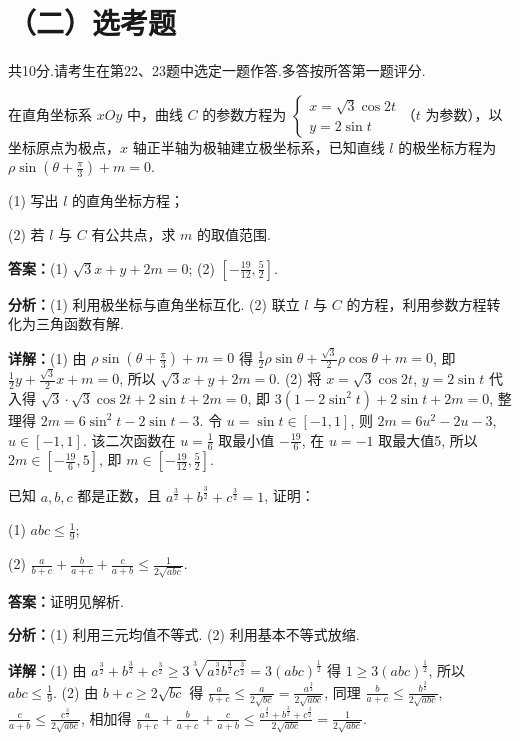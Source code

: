 \section*{（二）选考题}
共10分.请考生在第22、23题中选定一题作答.多答按所答第一题评分.

\begin{question}[points=10]
[选修4-4：坐标系与参数方程]

在直角坐标系 $xOy$ 中，曲线 $C$ 的参数方程为 $\begin{cases} x = \sqrt{3}\cos 2t \\ y = 2\sin t \end{cases}$（$t$ 为参数），以坐标原点为极点，$x$ 轴正半轴为极轴建立极坐标系，已知直线 $l$ 的极坐标方程为 $\rho\sin(\theta+\frac{\pi}{3})+m=0$.

(1) 写出 $l$ 的直角坐标方程；

(2) 若 $l$ 与 $C$ 有公共点，求 $m$ 的取值范围.
\begin{solution}
\textbf{答案：}(1) $\sqrt{3}x+y+2m=0$; (2) $[-\frac{19}{12}, \frac{5}{2}]$.

\textbf{分析：}(1) 利用极坐标与直角坐标互化.
(2) 联立 $l$ 与 $C$ 的方程，利用参数方程转化为三角函数有解.

\textbf{详解：}(1) 由 $\rho\sin(\theta+\frac{\pi}{3})+m=0$ 得 $\frac12\rho\sin\theta+\frac{\sqrt3}{2}\rho\cos\theta+m=0$, 即 $\frac12 y+\frac{\sqrt3}{2}x+m=0$, 所以 $\sqrt3 x+y+2m=0$.
(2) 将 $x=\sqrt3\cos2t$, $y=2\sin t$ 代入得 $\sqrt3\cdot\sqrt3\cos2t + 2\sin t + 2m=0$, 即 $3(1-2\sin^2t)+2\sin t+2m=0$, 整理得 $2m=6\sin^2t -2\sin t -3$. 令 $u=\sin t\in[-1,1]$, 则 $2m=6u^2-2u-3$, $u\in[-1,1]$. 该二次函数在 $u=\frac16$ 取最小值 $-\frac{19}{6}$, 在 $u=-1$ 取最大值5, 所以 $2m\in[-\frac{19}{6},5]$, 即 $m\in[-\frac{19}{12},\frac52]$.
\end{solution}
\end{question}

\begin{question}[points=10]
[选修4-5：不等式选讲]

已知 $a,b,c$ 都是正数，且 $a^{\frac32}+b^{\frac32}+c^{\frac32}=1$, 证明：

(1) $abc \le \frac19$;

(2) $\frac{a}{b+c}+\frac{b}{a+c}+\frac{c}{a+b} \le \frac{1}{2\sqrt{abc}}$.
\begin{solution}
\textbf{答案：}证明见解析.

\textbf{分析：}(1) 利用三元均值不等式.
(2) 利用基本不等式放缩.

\textbf{详解：}(1) 由 $a^{\frac32}+b^{\frac32}+c^{\frac32} \ge 3\sqrt[3]{a^{\frac32}b^{\frac32}c^{\frac32}} = 3(abc)^{\frac12}$ 得 $1 \ge 3(abc)^{\frac12}$, 所以 $abc \le \frac19$.
(2) 由 $b+c\ge2\sqrt{bc}$ 得 $\frac{a}{b+c} \le \frac{a}{2\sqrt{bc}} = \frac{a^{\frac32}}{2\sqrt{abc}}$, 同理 $\frac{b}{a+c} \le \frac{b^{\frac32}}{2\sqrt{abc}}$, $\frac{c}{a+b} \le \frac{c^{\frac32}}{2\sqrt{abc}}$, 相加得 $\frac{a}{b+c}+\frac{b}{a+c}+\frac{c}{a+b} \le \frac{a^{\frac32}+b^{\frac32}+c^{\frac32}}{2\sqrt{abc}} = \frac{1}{2\sqrt{abc}}$.
\end{solution}
\end{question}


